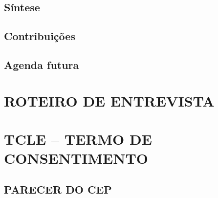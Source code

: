 \documentclass[
    12pt,
    openright,
    twoside,
    a4paper,
    chapter=TITLE,
    sumario=tradicional,
    section=TITLE,
    english,
    brazil
]{abntex2}
\begin{document}
\section{Síntese}
\section{Contribuições}
\section{Agenda futura}

\postextual



\begin{apendicesenv}
\partapendices
\chapter{ROTEIRO DE ENTREVISTA}
\chapter{TCLE -- TERMO DE CONSENTIMENTO}
\end{apendicesenv}

\begin{anexosenv}
\partanexos
\chapter{PARECER DO CEP}
\end{anexosenv}
\end{document}
